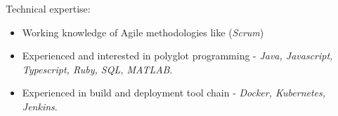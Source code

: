 
\inlineheadsection  %
  {Technical expertise:}
 {
 \emph{}
  \begin{itemize}
      \item Working knowledge of Agile methodologies like (\emph{Scrum})
      \item Experienced and interested in polyglot programming - \emph{Java, Javascript, Typescript, Ruby, SQL, MATLAB}.
      \item Experienced in build and deployment tool chain - \emph{Docker, Kubernetes, Jenkins}.
  \end{itemize}
  }
